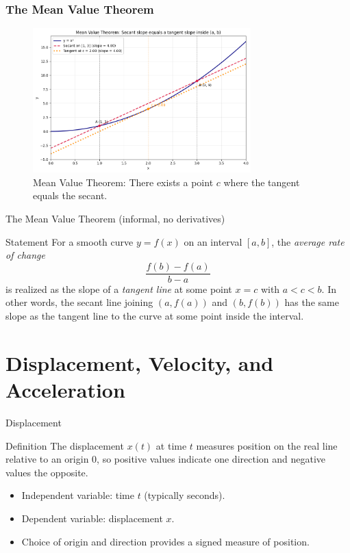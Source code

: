 \documentclass{beamer}
\begin{document}
\begin{frame}
  \frametitle{The Mean Value Theorem}
  \begin{figure}
    \includegraphics[width=0.75\textwidth]{figures/mean_value.png}
    \caption{Mean Value Theorem: There exists a point $c$ where the tangent equals the secant.}
  \end{figure}
\end{frame}
\begin{frame}{The Mean Value Theorem (informal, no derivatives)}
  \begin{block}{Statement}
  For a smooth curve $y=f(x)$ on an interval $[a,b]$, the \emph{average rate of change}
  \[ \dfrac{f(b)-f(a)}{b-a} \]
  is realized as the slope of a \emph{tangent line} at some point $x=c$ with $a<c<b$.
  In other words, the secant line joining $(a,f(a))$ and $(b,f(b))$ has the same slope as
  the tangent line to the curve at some point inside the interval.
  \end{block}
  \vspace{0.5em}
\end{frame}
\section{Displacement, Velocity, and Acceleration}
\begin{frame}{Displacement}
  \begin{block}{Definition}
    The displacement $x(t)$ at time $t$ measures position on the real line relative to an origin $0$, so positive values indicate one direction and negative values the opposite.
  \end{block}
  \begin{itemize}
    \item Independent variable: time $t$ (typically seconds).
    \item Dependent variable: displacement $x$.
    \item Choice of origin and direction provides a signed measure of position.
  \end{itemize}
\end{frame}
\end{document}
